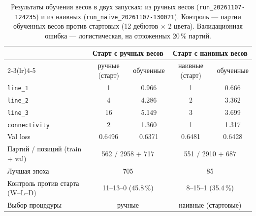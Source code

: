 \documentclass[a4paper,10pt,twocolumn]{article}
\newcommand{\code}[1]{\texttt{#1}}
\begin{document}
\begin{table}[t]
\centering
\caption{Результаты обучения весов в двух запусках: из ручных весов (\code{run\_20261107-124235}) и из наивных (\code{run\_naive\_20261107-130021}). Контроль --- партии обученных весов против стартовых (12 дебютов $\times$ 2 цвета). Валидационная ошибка --- логистическая, на отложенных 20\,\% партий.}
\label{tab:learning}
\begin{tabular}{@{}lcccc@{}}
\toprule
& \multicolumn{2}{c}{Старт с ручных весов} & \multicolumn{2}{c}{Старт с наивных весов} \\
\cmidrule(lr){2-3}\cmidrule(lr){4-5}
& ручные (старт) & обученные & наивные (старт) & обученные \\
\midrule
\code{line\_1} & 1 & 0.966 & 1 & 0.666 \\
\code{line\_2} & 4 & 4.286 & 2 & 3.362 \\
\code{line\_3} & 16 & 5.149 & 3 & 3.699 \\
\code{connectivity} & 2 & 1.360 & 1 & 1.317 \\
\midrule
Val loss & 0.6496 & 0.6371 & 0.6481 & 0.6428 \\
Партий / позиций (train + val) & \multicolumn{2}{c}{562 / 2958 + 717} & \multicolumn{2}{c}{551 / 2910 + 687} \\
Лучшая эпоха & \multicolumn{2}{c}{705} & \multicolumn{2}{c}{85} \\
Контроль против старта (W--L--D) & \multicolumn{2}{c}{11--13--0 (45.8\,\%)} & \multicolumn{2}{c}{8--15--1 (35.4\,\%)} \\
Выбор процедуры & \multicolumn{2}{c}{ручные} & \multicolumn{2}{c}{наивные (стартовые)} \\
\bottomrule
\end{tabular}
\end{table}
\end{document}
